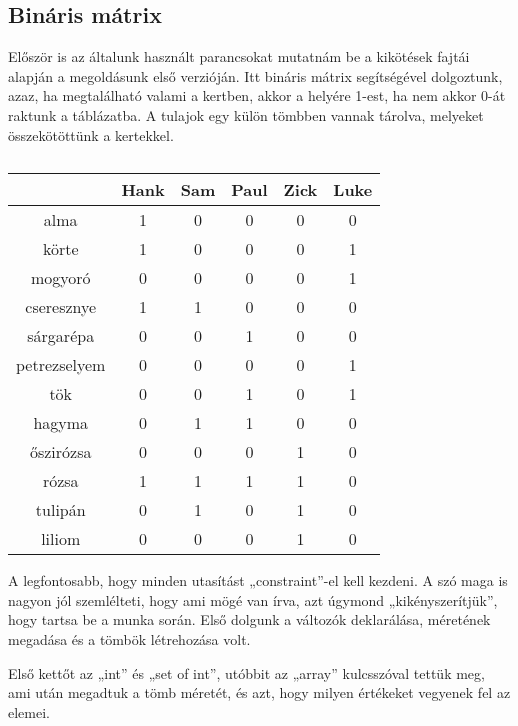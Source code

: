 \documentclass[12pt,a4paper,twoside, openright]{report}
\begin{document}
\subsection{Bináris mátrix}

    Először is az általunk használt parancsokat mutatnám be a kikötések fajtái alapján a megoldásunk első verzióján.
    Itt bináris mátrix segítségével dolgoztunk, azaz, ha megtalálható valami a kertben, akkor a helyére 1-est, ha nem akkor 0-át raktunk a táblázatba.
    A tulajok egy külön tömbben vannak tárolva, melyeket összekötöttünk a kertekkel.
	
	\begin{table}
		\centering
		\caption{}
		\begin{tabular}{|c|c|c|c|c|c|}
			\hline 
			& Hank & Sam & Paul & Zick & Luke \\ 
			\hline 
			alma & 1 & 0 & 0 & 0 & 0 \\ 
			\hline 
			körte & 1 & 0 & 0 & 0 & 1 \\ 
			\hline 
			mogyoró & 0 & 0 & 0 & 0 & 1 \\ 
			\hline 
			cseresznye & 1 & 1 & 0 & 0 & 0 \\ 
			\hline 
			sárgarépa & 0 & 0 & 1 & 0 & 0 \\ 
			\hline 
			petrezselyem & 0 & 0 & 0 & 0 & 1 \\ 
			\hline 
			tök & 0 & 0 & 1 & 0 & 1 \\ 
			\hline 
			hagyma & 0 & 1 & 1 & 0 & 0 \\ 
			\hline 
			őszirózsa & 0 & 0 & 0 & 1 & 0 \\ 
			\hline 
			rózsa & 1 & 1 & 1 & 1 & 0 \\ 
			\hline 
			tulipán & 0 & 1 & 0 & 1 & 0 \\ 
			\hline 
			liliom & 0 & 0 & 0 & 1 & 0 \\ 
			\hline 
		\end{tabular}
	\end{table}
     
    A legfontosabb, hogy minden utasítást „constraint”-el kell kezdeni.
    A szó maga is nagyon jól szemlélteti, hogy ami mögé van írva, azt úgymond „kikényszerítjük”, hogy tartsa be a munka során.
    Első dolgunk a változók deklarálása, méretének megadása és a tömbök létrehozása volt.

    Első kettőt az „int” és „set of int”, utóbbit az „array” kulcsszóval tettük meg, ami után megadtuk a tömb méretét, és azt, hogy milyen értékeket vegyenek fel az elemei.
\end{document}
